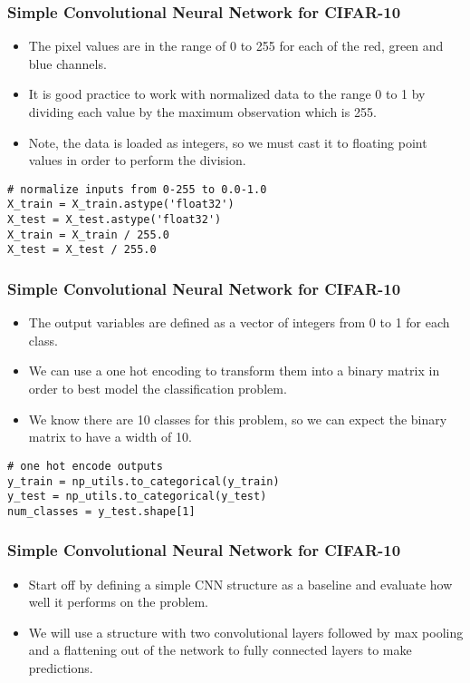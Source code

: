 \begin{frame}[fragile] \frametitle{Simple Convolutional Neural Network for CIFAR-10}
\begin{itemize}
\item The pixel values are in the range of 0 to 255 for each of the red, green and blue channels.
\item It is good practice to work with normalized data to the range 0 to 1 by dividing each value by the maximum observation which is 255.
\item Note, the data is loaded as integers, so we must cast it to floating point values in order to perform the division.
\end{itemize}
\begin{lstlisting}
# normalize inputs from 0-255 to 0.0-1.0
X_train = X_train.astype('float32')
X_test = X_test.astype('float32')
X_train = X_train / 255.0
X_test = X_test / 255.0
\end{lstlisting}
\end{frame}

\begin{frame}[fragile] \frametitle{Simple Convolutional Neural Network for CIFAR-10}
\begin{itemize}
\item The output variables are defined as a vector of integers from 0 to 1 for each class.
\item We can use a one hot encoding to transform them into a binary matrix in order to best model the classification problem. 
\item We know there are 10 classes for this problem, so we can expect the binary matrix to have a width of 10.
\end{itemize}
\begin{lstlisting}
# one hot encode outputs
y_train = np_utils.to_categorical(y_train)
y_test = np_utils.to_categorical(y_test)
num_classes = y_test.shape[1]
\end{lstlisting}
\end{frame}

\begin{frame}[fragile] \frametitle{Simple Convolutional Neural Network for CIFAR-10}
\begin{itemize}
\item Start off by defining a simple CNN structure as a baseline and evaluate how well it performs on the problem.
\item We will use a structure with two convolutional layers followed by max pooling and a flattening out of the network to fully connected layers to make predictions.
\end{itemize}
\end{frame}

